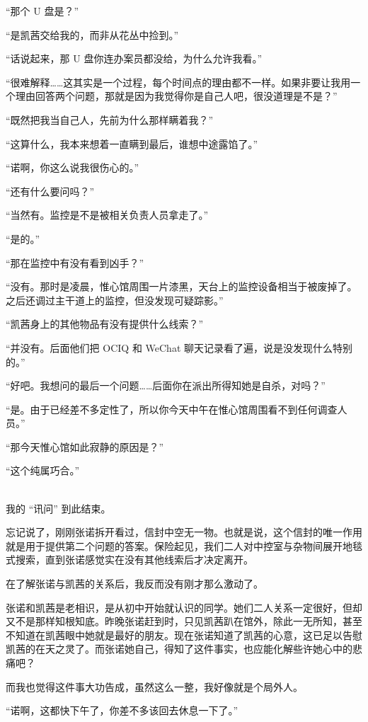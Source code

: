 \documentclass[UTF8]{ctexart}
\begin{document}
“那个 U 盘是？”

“是凯茜交给我的，而非从花丛中捡到。”

“话说起来，那 U 盘你连办案员都没给，为什么允许我看。”

“很难解释……这其实是一个过程，每个时间点的理由都不一样。如果非要让我用一个理由回答两个问题，那就是因为我觉得你是自己人吧，很没道理是不是？”

“既然把我当自己人，先前为什么那样瞒着我？”

“这算什么，我本来想着一直瞒到最后，谁想中途露馅了。”

“诺啊，你这么说我很伤心的。”

“还有什么要问吗？”

“当然有。监控是不是被相关负责人员拿走了。”

“是的。”

“那在监控中有没有看到凶手？”

“没有。那时是凌晨，惟心馆周围一片漆黑，天台上的监控设备相当于被废掉了。之后还调过主干道上的监控，但没发现可疑踪影。”

“凯茜身上的其他物品有没有提供什么线索？”

“并没有。后面他们把 OCIQ 和 WeChat 聊天记录看了遍，说是没发现什么特别的。”

“好吧。我想问的最后一个问题……后面你在派出所得知她是自杀，对吗？”

“是。由于已经差不多定性了，所以你今天中午在惟心馆周围看不到任何调查人员。”

“那今天惟心馆如此寂静的原因是？”

“这个纯属巧合。”

~\\

我的 “讯问” 到此结束。

忘记说了，刚刚张诺拆开看过，信封中空无一物。也就是说，这个信封的唯一作用就是用于提供第二个问题的答案。保险起见，我们二人对中控室与杂物间展开地毯式搜索，直到张诺感觉实在没有其他线索后才决定离开。

在了解张诺与凯茜的关系后，我反而没有刚才那么激动了。

张诺和凯茜是老相识，是从初中开始就认识的同学。她们二人关系一定很好，但却又不是那样知根知底。昨晚张诺赶到时，只见凯茜趴在馆外，除此一无所知，甚至不知道在凯茜眼中她就是最好的朋友。现在张诺知道了凯茜的心意，这已足以告慰凯茜的在天之灵了。而张诺她自己，得知了这件事实，也应能化解些许她心中的悲痛吧？

而我也觉得这件事大功告成，虽然这么一整，我好像就是个局外人。

“诺啊，这都快下午了，你差不多该回去休息一下了。”
\end{document}
